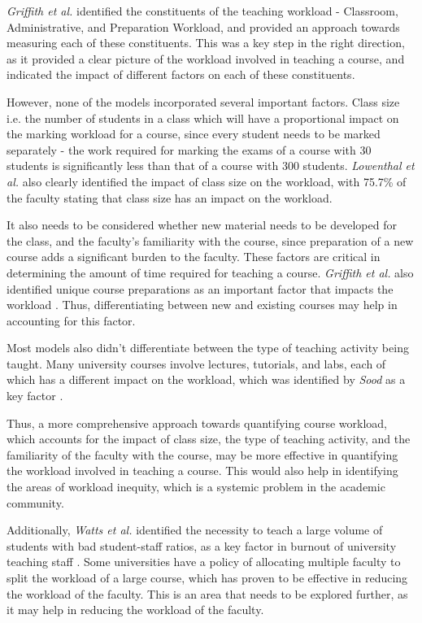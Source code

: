 \textit{Griffith et al.} identified the constituents of the teaching workload - Classroom, Administrative, and Preparation Workload, and provided an approach towards measuring each of these constituents. This was a key step in the right direction, as it provided a clear picture of the workload involved in teaching a course, and indicated the impact of different factors on each of these constituents.

However, none of the models incorporated several important factors. Class size i.e. the number of students in a class which will have a proportional impact on the marking workload for a course, since every student needs to be marked separately - the work required for marking the exams of a course with 30 students is significantly less than that of a course with 300 students. \textit{Lowenthal et al.} \cite{lowenthal2019does} also clearly identified the impact of class size on the workload, with 75.7\% of the faculty stating that class size has an impact on the workload.

It also needs to be considered whether new material needs to be developed for the class, and the faculty's familiarity with the course, since preparation of a new course adds a significant burden to the faculty. These factors are critical in determining the amount of time required for teaching a course. \textit{Griffith et al.} also identified unique course preparations as an important factor that impacts the workload \cite{griffith2020framework}. Thus, differentiating between new and existing courses may help in accounting for this factor.

Most models also didn't differentiate between the type of teaching activity being taught. Many university courses involve lectures, tutorials, and labs, each of which has a different impact on the workload, which was identified by \textit{Sood} as a key factor \cite{rohan2017}.

Thus, a more comprehensive approach towards quantifying course workload, which accounts for the impact of class size, the type of teaching activity, and the familiarity of the faculty with the course, may be more effective in quantifying the workload involved in teaching a course. This would also help in identifying the areas of workload inequity, which is a systemic problem in the academic community.

Additionally, \textit{Watts et al.} identified the necessity to teach a large volume of students with bad student-staff ratios, as a key factor in burnout of university teaching staff \cite{watts2011burnout}. Some universities have a policy of allocating multiple faculty to split the workload of a large course, which has proven to be effective in reducing the workload of the faculty. This is an area that needs to be explored further, as it may help in reducing the workload of the faculty.

